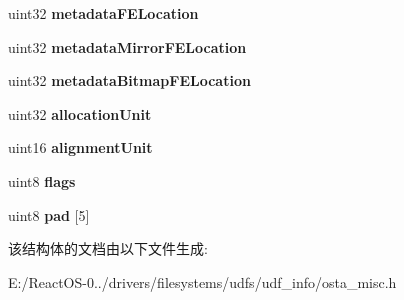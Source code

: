 \begin{DoxyCompactItemize}
\mbox{\label{struct___m_e_t_a_d_a_t_a___p_a_r_t_i_t_i_o_n___m_a_p_aba9c1c58e8c19e2ef00cb84daf26e2e5}} 
uint32 {\bfseries metadata\+F\+E\+Location}
\item 
\mbox{\label{struct___m_e_t_a_d_a_t_a___p_a_r_t_i_t_i_o_n___m_a_p_a0a34fa1c729758e7d661714bc83e1da3}} 
uint32 {\bfseries metadata\+Mirror\+F\+E\+Location}
\item 
\mbox{\label{struct___m_e_t_a_d_a_t_a___p_a_r_t_i_t_i_o_n___m_a_p_a72a00d051abfe889af3b35a8b7310339}} 
uint32 {\bfseries metadata\+Bitmap\+F\+E\+Location}
\item 
\mbox{\label{struct___m_e_t_a_d_a_t_a___p_a_r_t_i_t_i_o_n___m_a_p_acc7a92e4f43c16d19c9787198a48cc92}} 
uint32 {\bfseries allocation\+Unit}
\item 
\mbox{\label{struct___m_e_t_a_d_a_t_a___p_a_r_t_i_t_i_o_n___m_a_p_a337aa0353a6d27399018711c4063530e}} 
uint16 {\bfseries alignment\+Unit}
\item 
\mbox{\label{struct___m_e_t_a_d_a_t_a___p_a_r_t_i_t_i_o_n___m_a_p_a0893940465408cba03c4c3f5bae32591}} 
uint8 {\bfseries flags}
\item 
\mbox{\label{struct___m_e_t_a_d_a_t_a___p_a_r_t_i_t_i_o_n___m_a_p_a97c830aaf698c39e036fa7c120ce69b7}} 
uint8 {\bfseries pad} \mbox{[}5\mbox{]}
\end{DoxyCompactItemize}


该结构体的文档由以下文件生成\+:\begin{DoxyCompactItemize}
\item 
E\+:/\+React\+O\+S-\/0../drivers/filesystems/udfs/udf\+\_\+info/osta\+\_\+misc.\+h\end{DoxyCompactItemize}
